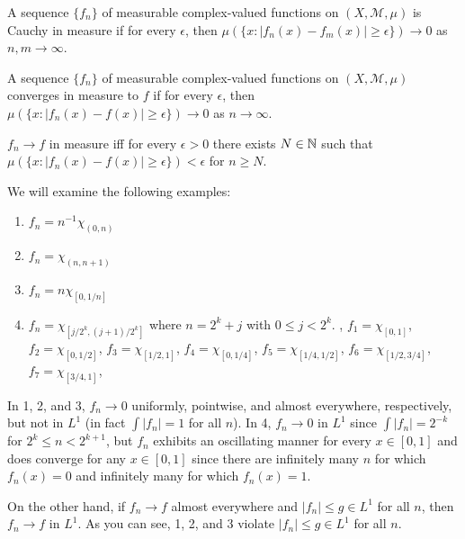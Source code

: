 \begin{definition}
    A sequence $\{ f_n \}$ of measurable complex-valued functions on $(X, \mathcal{M}, \mu)$ is Cauchy in measure if for every $\epsilon$, then $\mu(\{ x: |f_n(x) - f_m(x)| \ge \epsilon \}) \to 0$ as $n, m \to \infty$.
\end{definition}

\begin{definition}
    A sequence $\{ f_n \}$ of measurable complex-valued functions on $(X, \mathcal{M}, \mu)$ converges in measure to $f$ if for every $\epsilon$, then $\mu(\{ x: |f_n(x) - f(x)| \ge \epsilon \}) \to 0$ as $n \to \infty$.
\end{definition}

$f_n \to f$ in measure iff for every $\epsilon > 0$ there exists $N \in \mathbb{N}$ such that $\mu(\{ x: |f_n(x) - f(x)| \ge \epsilon \}) < \epsilon$ for $n \ge N$.

\begin{example}
    We will examine the following examples:
    \begin{enumerate}
        \item $f_n = n^{-1} \chi_{(0, n)}$
        \item $f_n = \chi_{(n, n+1)}$ 
        \item $f_n = n \chi_{[0, 1/n]}$
        \item $f_n = \chi_{[j/2^k, (j+1)/2^k]}$ where $n = 2^k + j$ with $0 \le j < 2^k$. \eg, $f_1 = \chi_{[0, 1]}$, $f_2 = \chi_{[0, 1/2]}$, $f_3 = \chi_{[1/2, 1]}$, $f_4 = \chi_{[0, 1/4]}$, $f_5 = \chi_{[1/4, 1/2]}$, $f_6 = \chi_{[1/2, 3/4]}$, $f_7 = \chi_{[3/4, 1]}$, \etc
    \end{enumerate}
\end{example}

In 1, 2, and 3, $f_n \to 0$ uniformly, pointwise, and almost everywhere, respectively, but not in $L^1$ (in fact $\int |f_n| = 1$ for all $n$).
In 4, $f_n \to 0$ in $L^1$ since $\int |f_n| = 2^{-k}$ for $2^k \le n < 2^{k+1}$, but $f_n$ exhibits an oscillating manner for every $x \in [0, 1]$ and does converge for any $x \in [0, 1]$ since there are infinitely many $n$ for which $f_n(x) = 0$ and infinitely many for which $f_n(x) = 1$.

On the other hand, if $f_n \to f$ almost everywhere and $|f_n| \le g \in L^1$ for all $n$, then $f_n \to f$ in $L^1$.
As you can see, 1, 2, and 3 violate $|f_n| \le g \in L^1$ for all $n$.


